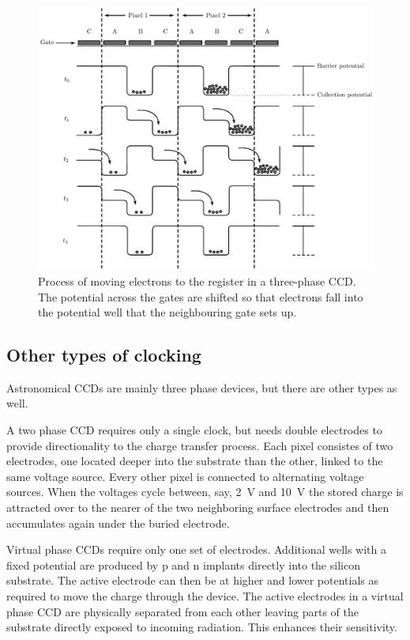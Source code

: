 \begin{figure}[htpb]
	\centering
	\includegraphics[width=\textwidth]{ccd-shifting-potential.pdf}
	\caption{Process of moving electrons to the register in a three-phase CCD. The potential across the gates
	are shifted so that electrons fall into the potential well that the neighbouring gate
	sets up.}
	\label{fig:ccd-shifting-potential}
\end{figure}

\subsection{Other types of clocking}

Astronomical CCDs are mainly three phase devices, but there are other types
as well. 

A two phase CCD requires only a single clock, but needs double electrodes 
to provide directionality to the charge transfer process. Each pixel consistes
of two electrodes, one located deeper into the substrate than the other, 
linked to the same voltage source. Every other pixel is connected to 
alternating voltage sources. When the voltages cycle between, say, 2~V and
10~V the stored charge is attracted over to the nearer of the two neighboring
surface electrodes and then accumulates again under the buried electrode.

Virtual phase CCDs require only one set of electrodes. Additional wells with
a fixed potential are produced by p and n implants directly into the silicon
substrate. The active electrode can then be at higher and lower potentials 
as required to move the charge through the device. The active electrodes
in a virtual phase CCD are physically separated from each other leaving 
parts of the substrate directly exposed to incoming radiation. This 
enhances their sensitivity.

